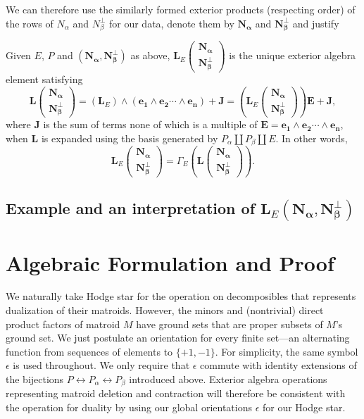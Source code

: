 \documentclass[Unicode]{cedram-alco}
\newcommand{\ext}[1]{\ensuremath{\mathbf{#1}}}
\newcommand{\dunion}{\coprod}
\newcommand{\extLVert}[2]{\ext{L}\left( \begin{array}{c} {#1}\\ {#2} \end{array} \right)}
\newcommand{\extLVertSub}[3]{\ext{L}_{#1}\left( \begin{array}{c} {#2}\\ {#3} \end{array} \right)}
\begin{document}
We can therefore use the similarly formed exterior products
(respecting order) of the rows of $N_\alpha$ and $N_\beta^\perp$
for our data, denote them by 
$\ext{N_\alpha}$ and $\ext{N_\beta^\perp}$
and justify

\begin{defi}
  Given $E$, $P$ and $(\ext{N_\alpha},\ext{N_\beta^\perp})$ as above,
  $\extLVertSub{E}{\ext{N_\alpha}}{\ext{N_\beta^\perp}}$ is the
  unique exterior algebra element satisfying
  \[
  \extLVert{\ext{N_\alpha}}{\ext{N_\beta^\perp}}=
  (\ext{L}_E)\wedge (\ext{e_1}\wedge\ext{e_2}\cdots\wedge\ext{e_n}) + \ext{J} =
  (\extLVertSub{E}{\ext{N_\alpha}}{\ext{N_\beta^\perp}})\ext{E}+\ext{J},
  \]
where $\ext{J}$ is the sum of terms none of which is a multiple of
$\ext{E}=\ext{e_1}\wedge\ext{e_2}\cdots\wedge\ext{e_n}$, when
$\ext{L}$ is expanded using the basis generated by $P_\alpha \dunion
P_\beta \dunion E$.  In other words,
  \[ 
  \extLVertSub{E}
              {\ext{N_\alpha}}
              {\ext{N_\beta^\perp}}
              =
              \Gamma_E(
              \extLVert{\ext{N_\alpha}}{\ext{N_\beta^\perp}}).
  \]
\end{defi}


\subsection{Example and an interpretation of $\ext{L}_E(\ext{N_\alpha},\ext{N_\beta^\perp})$}\label{ExamK4}






\section{Algebraic Formulation and Proof}

We naturally take Hodge star for the operation on
decomposibles that represents dualization of their
matroids.
However, the minors and
(nontrivial) direct product factors of matroid $M$
have ground sets that are proper subsets of $M$'s ground set.
We just postulate an orientation for every finite set---an alternating
function
from sequences of elements to $\{+1,-1\}$.
For simplicity, the same symbol $\epsilon$ is used throughout.
We only require that $\epsilon$ commute with identity
extensions of the bijections 
$P \leftrightarrow P_{\alpha}\leftrightarrow P_{\beta}$
introduced above.
Exterior algebra operations
representing matroid deletion and contraction will therefore
be consistent with the operation for duality by using our
global orientations $\epsilon$ for our Hodge star.
\end{document}
